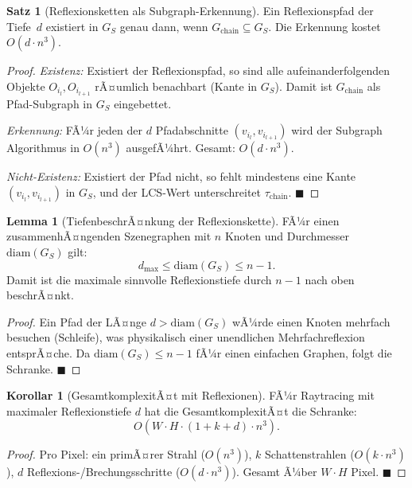 ﻿\documentclass[a4paper,12pt]{article}
\theoremstyle{definition}
\newtheorem{satz}{Satz}[section]
\newtheorem{lemma}{Lemma}[section]
\newtheorem{korollar}{Korollar}[section]
\begin{document}
\begin{satz}[Reflexionsketten als Subgraph-Erkennung]
  \label{satz:reflexion}
  Ein Reflexionspfad der Tiefe~$d$ existiert in $G_S$ genau dann,
  wenn $G_{\mathrm{chain}} \subseteq G_S$.
  Die Erkennung kostet $O(d \cdot n^3)$.
\end{satz}

\begin{proof}
  \emph{Existenz:} Existiert der Reflexionspfad, so sind alle
  aufeinanderfolgenden Objekte $O_{i_l}, O_{i_{l+1}}$ rÃ¤umlich
  benachbart (Kante in $G_S$). Damit ist $G_{\mathrm{chain}}$
  als Pfad-Subgraph in $G_S$ eingebettet.

  \emph{Erkennung:} FÃ¼r jeden der $d$ Pfadabschnitte
  $(v_{i_l}, v_{i_{l+1}})$ wird der Subgraph Algorithmus in
  $O(n^3)$ ausgefÃ¼hrt. Gesamt: $O(d \cdot n^3)$.

  \emph{Nicht-Existenz:} Existiert der Pfad nicht, so fehlt
  mindestens eine Kante $(v_{i_l}, v_{i_{l+1}})$ in $G_S$,
  und der LCS-Wert unterschreitet $\tau_{\mathrm{chain}}$.
  \hfill$\blacksquare$
\end{proof}

\begin{lemma}[TiefenbeschrÃ¤nkung der Reflexionskette]
  \label{lem:tiefenbeschraenkung}
  FÃ¼r einen zusammenhÃ¤ngenden Szenegraphen mit $n$ Knoten und
  Durchmesser $\mathrm{diam}(G_S)$ gilt:
  \[
    d_{\max} \leq \mathrm{diam}(G_S) \leq n - 1.
  \]
  Damit ist die maximale sinnvolle Reflexionstiefe durch $n-1$
  nach oben beschrÃ¤nkt.
\end{lemma}

\begin{proof}
  Ein Pfad der LÃ¤nge $d > \mathrm{diam}(G_S)$ wÃ¼rde einen Knoten
  mehrfach besuchen (Schleife), was physikalisch einer unendlichen
  Mehrfachreflexion entsprÃ¤che. Da $\mathrm{diam}(G_S) \leq n-1$
  fÃ¼r einen einfachen Graphen, folgt die Schranke.
  \hfill$\blacksquare$
\end{proof}

\begin{korollar}[GesamtkomplexitÃ¤t mit Reflexionen]
  FÃ¼r Raytracing mit maximaler Reflexionstiefe $d$ hat die
  GesamtkomplexitÃ¤t die Schranke:
  \[
    O\!\left(W \cdot H \cdot (1 + k + d) \cdot n^3\right).
  \]
\end{korollar}

\begin{proof}
  Pro Pixel: ein primÃ¤rer Strahl ($O(n^3)$), $k$ Schattenstrahlen
  ($O(k \cdot n^3)$), $d$ Reflexions-/Brechungsschritte
  ($O(d \cdot n^3)$). Gesamt Ã¼ber $W \cdot H$ Pixel. \hfill$\blacksquare$
\end{proof}
\end{document}
